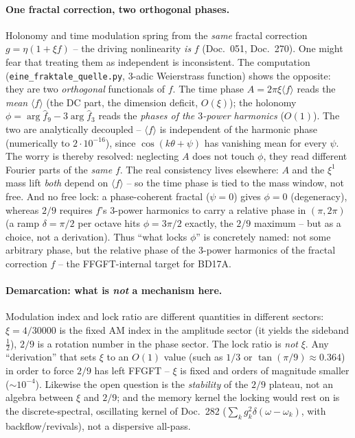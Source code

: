 \paragraph{One fractal correction, two orthogonal phases.} Holonomy and time modulation spring from
the \emph{same} fractal correction $g=\eta(1+\xi f)$ -- the driving nonlinearity \emph{is} $f$
(Doc.~051, Doc.~270). One might fear that treating them as independent is inconsistent. The computation
(\texttt{eine\_fraktale\_quelle.py}, $3$-adic Weierstrass function) shows the opposite: they are two
\emph{orthogonal} functionals of $f$. The time phase $A=2\pi\xi\langle f\rangle$ reads the \emph{mean}
$\langle f\rangle$ (the DC part, the dimension deficit, $O(\xi)$); the holonomy
$\phi=\arg\hat f_9-3\arg\hat f_3$ reads the \emph{phases of the $3$-power harmonics} ($O(1)$). The two
are analytically decoupled -- $\langle f\rangle$ is independent of the harmonic phase (numerically to
$2\cdot10^{-16}$), since $\cos(k\theta+\psi)$ has vanishing mean for every $\psi$. The worry is thereby
resolved: neglecting $A$ does not touch $\phi$, they read different Fourier parts of the \emph{same} $f$.
The real consistency lives elsewhere: $A$ and the $\xi^1$ mass lift \emph{both} depend on
$\langle f\rangle$ -- so the time phase is tied to the mass window, not free. And no free lock: a
phase-coherent fractal ($\psi=0$) gives $\phi=0$ (degeneracy), whereas $2/9$ requires $f$'s $3$-power
harmonics to carry a relative phase in $(\pi,2\pi)$ (a ramp $\delta=\pi/2$ per octave hits $\phi=3\pi/2$
exactly, the $2/9$ maximum -- but as a choice, not a derivation). Thus \enquote{what locks $\phi$} is
concretely named: not some arbitrary phase, but the relative phase of the $3$-power harmonics of the
fractal correction $f$ -- the FFGFT-internal target for BD17A.

\paragraph{Demarcation: what is \emph{not} a mechanism here.} Modulation index and lock ratio are
different quantities in different sectors: $\xi=4/30000$ is the fixed AM index in the amplitude sector
(it yields the sideband $\tfrac12$), $2/9$ is a rotation number in the phase sector. The lock ratio is
\emph{not} $\xi$. Any \enquote{derivation} that sets $\xi$ to an $O(1)$ value (such as $1/3$ or
$\tan(\pi/9)\approx0.364$) in order to force $2/9$ has left FFGFT -- $\xi$ is fixed and orders of
magnitude smaller ($\sim\!10^{-4}$). Likewise the open question is the \emph{stability} of the $2/9$
plateau, not an algebra between $\xi$ and $2/9$; and the memory kernel the locking would rest on is the
discrete-spectral, oscillating kernel of Doc.~282 ($\sum_k g_k^2\delta(\omega-\omega_k)$, with
backflow/revivals), not a dispersive all-pass.

